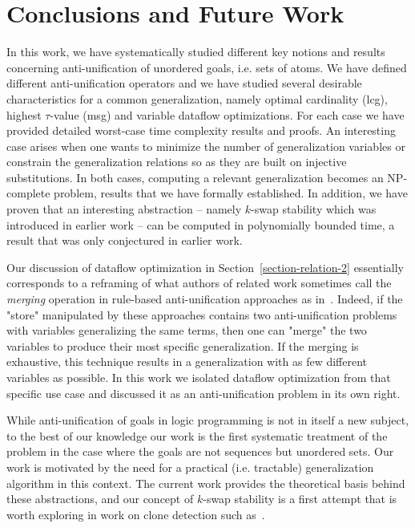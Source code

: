 \section{Conclusions and Future Work}\label{section-conclusion}
In this work, we have systematically studied different key notions and results concerning anti-unification of unordered goals, i.e. sets of atoms. We have defined different anti-unification operators and we have studied several desirable characteristics for a common generalization, namely optimal cardinality (lcg), highest $\tau$-value (msg) and variable dataflow optimizations. For each case we have provided detailed worst-case time complexity results and proofs. An interesting case arises when one wants to minimize the number of generalization variables or constrain the generalization relations so as they are built on injective substitutions. In both cases, computing a relevant generalization becomes an NP-complete problem, results that we have formally established.
In addition, we have proven that an interesting abstraction -- namely $k$-swap stability which was introduced in earlier work -- can be computed in polynomially bounded time, a result that was only conjectured in  earlier work. 

Our discussion of dataflow optimization in Section~\ref{section-relation-2} essentially corresponds to a reframing of what authors of related work sometimes call the \textit{merging} operation in rule-based anti-unification approaches as in~\cite{Baumgartner2017}. Indeed, if the "store" manipulated by these approaches contains two anti-unification problems with variables generalizing the same terms, then one can "merge" the two variables to produce their most specific generalization. If the merging is exhaustive, this technique results in a generalization with as few different variables as possible. In this work we isolated dataflow optimization from that specific use case and discussed it as an anti-unification problem in its own right.

While anti-unification of goals in logic programming is not in itself a new subject, to the best of our knowledge our work is the first systematic treatment of the problem in the case where the goals are not sequences but unordered sets. Our work is motivated by the need for a practical (i.e. tractable) generalization algorithm in this context. The current work provides the theoretical basis behind these abstractions, and our concept of $k$-swap stability is a first attempt that is worth exploring in work on clone detection such as~\cite{clones}. 

